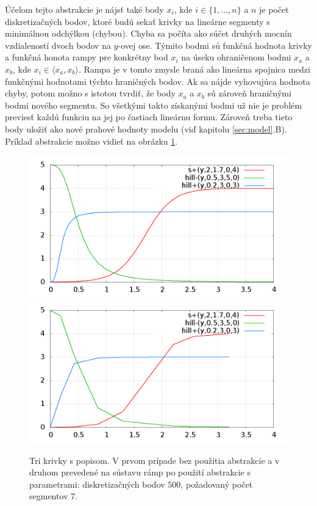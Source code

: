 \documentclass[11pt,final,oneside]{fithesis}
\begin{document}
\' U\v celom tejto abstrakcie je n\'ajs\v t tak\'e body $x_i$, kde $i \in \{1,\dots{},n\}$ a $n$ je po\v cet diskretiza\v cn\'ych bodov, ktor\'e bud\'u 
seka\v t krivky na line\'arne segmenty s minim\'alnou odch\'ylkou (chybou). Chyba sa po\v c\'ita ako s\'u\v cet druh\'ych mocn\'in vzdialenost\'i dvoch bodov 
na $y$-ovej ose. T\'ymito bodmi s\'u funk\v cn\'a hodnota krivky a funk\v cn\'a honota rampy pre konkr\'etny bod $x_i$ na \'useku ohrani\v cenom bodmi 
$x_a$ a $x_b$, kde $x_i \in \langle x_a,x_b\rangle$. Rampa je v tomto zmysle bran\'a ako line\'arna spojnica medzi funk\v cn\'ymi hodnotami t\'ychto
hrani\v cn\'ych bodov. Ak sa n\'ajde vyhovuj\'uca hodnota chyby, potom mo\v zno s istotou tvrdi\v t, \v ze body $x_a$ a $x_b$ s\' u z\'arove\v n 
hrani\v cn\'ymi bodmi nov\'eho segmentu. So v\v setk\'ymi takto z\'iskan\'ymi bodmi u\v z nie je probl\'em previes\v t ka\v zd\'u funkciu na jej po \v castiach 
line\'arnu formu. Z\'arove\v n treba tieto body ulo\v zi\v t ako nov\'e prahov\'e hodnoty modelu (vi\v d kapitolu \ref{sec:model}.B). 
Pr\'iklad abstrakcie mo\v zno vidie\v t na obr\'azku \ref{fig:noabstract}.
\begin{figure}[t]
	\label{fig:noabstract}
    \centering
    \includegraphics[width=1\textwidth]{abstractNO}
    \includegraphics[width=1\textwidth]{abstractYES}
    \caption{Tri krivky s popisom. V prvom pr\'ipade bez pou\v zitia abstrakcie a v druhom preveden\'e na s\'ustavu r\'amp po pou\v zit\'i abstrakcie 
    s parametrami: diskretiza\v cn\'ych bodov $500$, po\v zadovan\'y po\v cet segmentov $7$.}
\end{figure}
\end{document}
